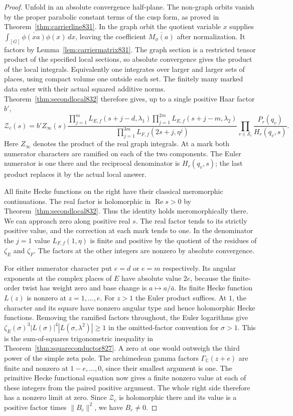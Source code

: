 \documentclass[a4paper,11pt]{article}
\theoremstyle{definition}
\theoremstyle{remark}
\numberwithin{equation}{section}
\begin{document}
\begin{proof}
Unfold in an absolute convergence half-plane. The non-graph
orbits vanish by the proper parabolic constant terms of the
cusp form, as proved in Theorem~\ref{thm:carrierline831}.
In the graph orbit the quotient variable \(x\) supplies
\(\int_{[G]}\overline{\phi(xa)}\phi(x)\,dx\), leaving
the coefficient \(\overline{M_\phi(a)}\) after normalization.
It factors by Lemma~\ref{lem:carriermatrix831}. The graph
section is a restricted tensor product of the specified
local sections, so absolute convergence gives the product
of the local integrals. Equivalently one integrates over
larger and larger sets of places, using compact volume one
outside each set. The finitely many marked data enter with
their actual squared additive norms. Theorem~\ref{thm:secondlocal832}
therefore gives, up to a single positive Haar factor \(b'\),
\[
 \mathcal Z_c(s)=b' Z_\infty(s)
 \frac{\displaystyle
       \prod_{j=1}^{m}L_{E,f}(s+j-d,\lambda_1)
       \prod_{j=1}^{2m}L_{E,f}(s+j-m,\lambda_2)}
      {\displaystyle\prod_{j=1}^{3m}L_{F,f}(2s+j,\eta^j)}
        \prod_{v\in\mathcal S_c}\frac{P_r(q_v)}{H_r(q_v,s)} .
\]
Here \(Z_\infty\) denotes the product of the real graph
integrals. At a mark both numerator characters are ramified
on each of the two components. The Euler numerator is one
there and the reciprocal denominator is \(H_r(q_v,s)\);
the last product replaces it by the actual local answer.

All finite Hecke functions on the right have their classical
meromorphic continuations. The real factor is holomorphic in
\(\operatorname{Re}s>0\) by Theorem~\ref{thm:secondlocal832}.
Thus the identity holds meromorphically there. We can approach
zero along positive real \(s\). The real factor tends to its
strictly positive value, and the correction at each mark tends
to one. In the denominator the \(j=1\) value \(L_{F,f}(1,\eta)\)
is finite and positive by the quotient of the residues of
\(\zeta_E\) and \(\zeta_F\). The factors at the other integers
are nonzero by absolute convergence.

For either numerator character put \(e=d\) or \(e=m\)
respectively. Its angular exponents at the complex places
of \(E\) have absolute value \(2e\), because the finite-order
twist has weight zero and base change is \(a\mapsto a/\bar a\).
Its finite Hecke function \(L(z)\) is nonzero at \(z=1,\ldots,e\).
For \(z>1\) the Euler product suffices. At \(1\), the character
and its square have nonzero angular type and hence holomorphic
Hecke functions. Removing the ramified factors throughout,
the Euler logarithms give
\(\zeta_E(\sigma)^3|L(\sigma)|^4|L(\sigma,\lambda^2)|\ge1\)
in the omitted-factor convention for \(\sigma>1\). This is
the sum-of-squares trigonometric inequality in
Theorem~\ref{thm:squareconductor827}. A zero at one would
outweigh the third power of the simple zeta pole. The
archimedean gamma factors \(\Gamma_{\mathbb C}(z+e)\) are
finite and nonzero at \(1-e,\ldots,0\), since their smallest
argument is one. The primitive Hecke functional equation
now gives a finite nonzero value at each of these integers
from the paired positive argument. The whole right side
therefore has a nonzero limit at zero. Since \(\mathcal Z_c\)
is holomorphic there and its value is a positive factor
times \(\|B_c\|^2\), we have \(B_c\ne0\).


\end{proof}
\end{document}

